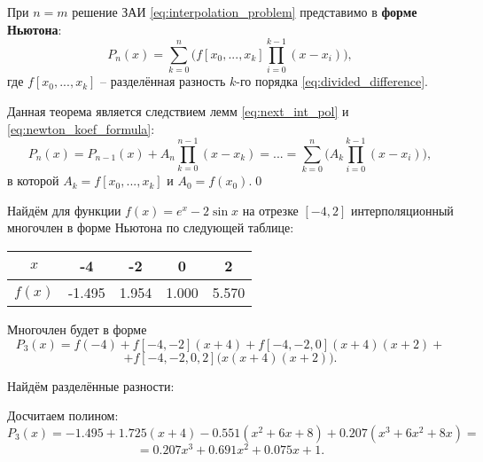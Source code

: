\documentclass[../main.tex]{subfile}
\begin{document}
\begin{theorem}\label{eq:newton_polynomial}
	При $n=m$ решение ЗАИ \eqref{eq:interpolation_problem} представимо в
	\textbf{форме Ньютона}:
	\[\boxed{P_n(x)=\sum_{k=0}^{n}\big(f[x_0,...,x_k]\prod_{i=0}^{k-1}
	(x-x_i)\big)},\]
	где $f[x_0,...,x_k]$ -- разделённая разность $k$-го порядка
	\eqref{eq:divided_difference}.
\end{theorem}

\beginproof

	Данная теорема является следствием лемм \eqref{eq:next_int_pol} и
	\eqref{eq:newton_koef_formula}:
	\[P_n(x)=P_{n-1}(x)+A_n\prod_{k=0}^{n-1}(x-x_k)=...=
	\sum_{k=0}^{n}\big(A_k\prod_{i=0}^{k-1}(x-x_i)\big),\]
	в которой $A_k=f[x_0,...,x_k]$ и $A_0=f(x_0)$.\qed

\begin{example}
	Найдём для функции $f(x)=e^x-2\sin x$ на отрезке $[-4,2]$ интерполяционный
	многочлен в форме Ньютона по следующей таблице:

	\begin{tabular}{|c|c|c|c|c|}
		\hline
		$x$	& -4	& -2	& 0	& 2	\\
		\hline
		$f(x)$	&-1.495	& 1.954	& 1.000	& 5.570	\\
		\hline
	\end{tabular}

	Многочлен будет в форме
	\[P_3(x)=f(-4)+f[-4,-2](x+4)+f[-4,-2,0](x+4)(x+2)+\]
	\[+f[-4,-2,0,2]\big(x(x+4)(x+2)\big).\]

	Найдём разделённые разности:

	\begin{table}[h]
		\centering
	\end{table}
	Досчитаем полином:
	\[P_3(x)=-1.495+1.725(x+4)-0.551(x^2+6x+8)+0.207(x^3+6x^2+8x)=\]
	\[=0.207x^3+0.691x^2+0.075x+1.\]
	\newpage


\end{example}
\end{document}

